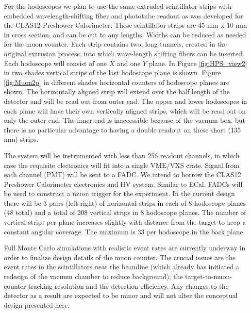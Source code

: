 For the hodoscopes we plan to use the same extruded scintillator strips with embedded wavelength-shifting fiber and phototube readout as was developed for the CLAS12 Preshower Calorimeter. These scintillator strips are 45 mm x 10 mm in cross section, and can be cut to any lengths. Widths can be reduced as needed for the muon counter. Each strip contains two, long tunnels, created in the original extrusion process, into which wave-length shifting fibers can be inserted.  Each hodoscope will consist of one $X$ and one $Y$ plane.  In Figure \ref{fig:HPS_view2} in two shades vertical strips of the last hodoscope plane is shown. Figure \ref{fig:Muon2p} in different shades horizontal counters of hodoscope planes are shown. The horizontally aligned strip will extend over the half length of the detector and will be read out from outer end.  The upper and lower hodoscopes in each plane will have their own vertically aligned strips, which will be read out on only the outer end.  The inner end is inaccessible because of the vacuum box, but there is no particular advantage to having a double readout on these short (135 mm) strips.  

The system will be instrumented with less than 256 readout channels, in which case the requisite electronics will 
fit into a single VME/VXS crate.  Signal from each channel (PMT) 
will be sent to a FADC.  We intend to borrow the CLAS12 Preshower Calorimeter electronics and HV system.  Similar to ECal, FADCs will be used to construct a muon trigger for the experiment.  In the current design there will be 3 pairs (left-right) of horizontal strips in each of 8 hodoscope planes (48 total) and a total of 208 vertical strips in 8 hodoscope planes.  The number of vertical strips per plane increases slightly with distance from the target to keep a constant angular coverage.  The maximum is 33 per hodoscope in the back plane.

Full Monte Carlo simulations with realistic event rates are currently underway in order to finalize design details of the muon counter.  The crucial issues are the event rates in the scintillators near the beamline (which already has initiated a redesign of the vacuum chamber to reduce background), the target-to-muon-counter tracking resolution and the detection efficiency.  Any changes to the detector as a result are expected to be minor and will not alter the conceptual design presented here.

